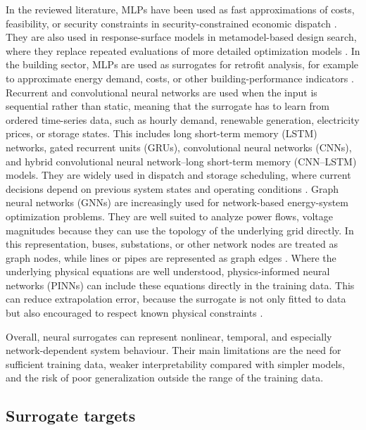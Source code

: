 \documentclass[final,5p,times,twocolumn]{elsarticle}
\begin{document}
In the reviewed literature, MLPs have been used as fast approximations
of costs, feasibility, or security constraints in security-constrained
economic dispatch
\cite{Chen2022,Chen20244723,Wu2022231,Xu20223066,Guo20222057,Li202359995}.
They are also used in response-surface models in metamodel-based design
search, where they replace repeated evaluations of more detailed
optimization models
\cite{Hirvonen2017323,Jia2022553,Li2023,Wang2020202933}.
In the building sector, MLPs are used as surrogates for retrofit
analysis, for example to approximate energy demand, costs, or other
building-performance indicators
\cite{Thrampoulidis2021,Reynolds2017704,Koschwitz2018134}. Recurrent and
convolutional neural networks are used when the input is sequential
rather than static, meaning that the surrogate has to learn from ordered
time-series data, such as hourly demand, renewable generation,
electricity prices, or storage states. This includes long short-term
memory (LSTM) networks, gated recurrent units (GRUs), convolutional
neural networks (CNNs), and hybrid convolutional neural network--long
short-term memory (CNN--LSTM) models. They are widely used in dispatch
and storage scheduling, where current decisions depend on previous
system states and operating conditions
\cite{Rafi202132436,Sideratos2020,Li2019,Tian2020,Yang2020415,Wang2023,Shi2024,Lu20232989,Hanifi2024}.
Graph neural networks (GNNs) are increasingly used for network-based
energy-system optimization problems. They are well suited to analyze
power flows, voltage magnitudes because they can use the topology of the
underlying grid directly. In this representation, buses, substations, or
other network nodes are treated as graph nodes, while lines or pipes are
represented as graph edges
\cite{Park2019,Su2022315,Liu20223726,Chen2023657}. Where the
underlying physical equations are well understood, physics-informed
neural networks (PINNs) can include these equations directly in the
training data. This can reduce extrapolation error, because the
surrogate is not only fitted to data but also encouraged to respect
known physical constraints
\cite{Park2019,Su2022315,Liu20222679,Chen2023657}.

Overall, neural surrogates can represent nonlinear, temporal, and
especially network-dependent system behaviour. Their main limitations
are the need for sufficient training data, weaker interpretability
compared with simpler models, and the risk of poor generalization
outside the range of the training data.

\subsection{Surrogate targets}
\label{sec:tax:targets}
\end{document}
